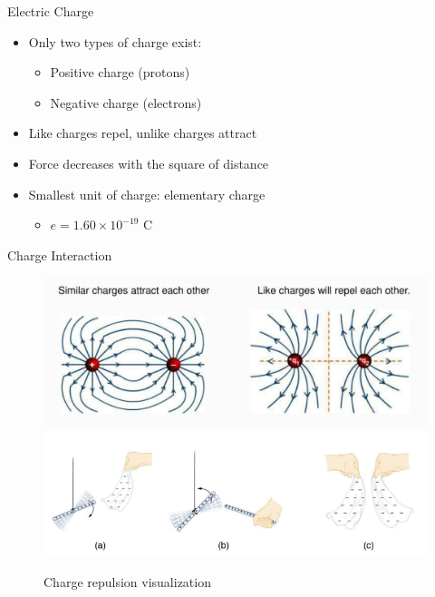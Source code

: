 \documentclass{beamer}
\newcommand{\highlight}[1]{\textcolor{ds9red}{#1}}
\begin{document}
\begin{frame}{Electric Charge}
 
        \begin{itemize}
            \item Only \highlight{two types of charge} exist:
                \begin{itemize}
                    \item Positive charge (protons)
                    \item Negative charge (electrons)
                \end{itemize}
            \item \highlight{Like charges repel}, \highlight{unlike charges attract}
            \item Force decreases with the \highlight{square of distance}
            \item Smallest unit of charge: \highlight{elementary charge}
                \begin{itemize}
                    \item $e = 1.60 \times 10^{-19}$ C
                \end{itemize}
        \end{itemize}

\end{frame}

\begin{frame}{Charge Interaction}
    
        \centering
        \begin{figure}
            \centering
            \includegraphics[width=0.9\linewidth]{phys12-electrostatics-field-lines-repulsion.png}
            \vspace{0.5cm}
            \includegraphics[width=0.9\linewidth]{phys12-electrostatics-charge-repulsion.png}
            \caption{Charge repulsion visualization}
        \end{figure}
\end{frame}
\end{document}
